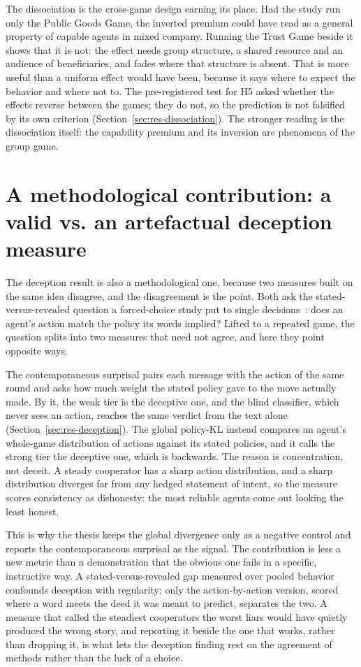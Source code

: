 The dissociation is the cross-game design earning its place. Had the study run only the Public
Goods Game, the inverted premium could have read as a general property of capable agents in
mixed company. Running the Trust Game beside it shows that it is not: the effect needs group
structure, a shared resource and an audience of beneficiaries, and fades where that structure is
absent. That is more useful than a uniform effect would have been, because it says where to
expect the behavior and where not to. The pre-registered test for H5 asked whether the effects
reverse between the games; they do not, so the prediction is not falsified by its own criterion
(Section~\ref{sec:res-dissociation}). The stronger reading is the dissociation itself: the
capability premium and its inversion are phenomena of the group game.

\section{A methodological contribution: a valid vs. an artefactual deception measure}
\label{sec:disc-deception}

The deception result is also a methodological one, because two measures built on the same idea
disagree, and the disagreement is the point. Both ask the stated-versus-revealed question a
forced-choice study put to single decisions~\cite{alignmentrevisited2025}: does an agent's
action match the policy its words implied? Lifted to a repeated game, the question splits into
two measures that need not agree, and here they point opposite ways.

The contemporaneous surprisal pairs each message with the action of the same round and asks how
much weight the stated policy gave to the move actually made. By it, the weak tier is the
deceptive one, and the blind classifier, which never sees an action, reaches the same verdict
from the text alone (Section~\ref{sec:res-deception}). The global policy-KL instead compares an
agent's whole-game distribution of actions against its stated policies, and it calls the strong
tier the deceptive one, which is backwards. The reason is concentration, not deceit. A steady
cooperator has a sharp action distribution, and a sharp distribution diverges far from any hedged
statement of intent, so the measure scores consistency as dishonesty: the most reliable agents
come out looking the least honest.

This is why the thesis keeps the global divergence only as a negative control and reports the
contemporaneous surprisal as the signal. The contribution is less a new metric than a
demonstration that the obvious one fails in a specific, instructive way. A stated-versus-revealed
gap measured over pooled behavior confounds deception with regularity; only the action-by-action
version, scored where a word meets the deed it was meant to predict, separates the two. A measure
that called the steadiest cooperators the worst liars would have quietly produced the wrong
story, and reporting it beside the one that works, rather than dropping it, is what lets the
deception finding rest on the agreement of methods rather than the luck of a choice.

